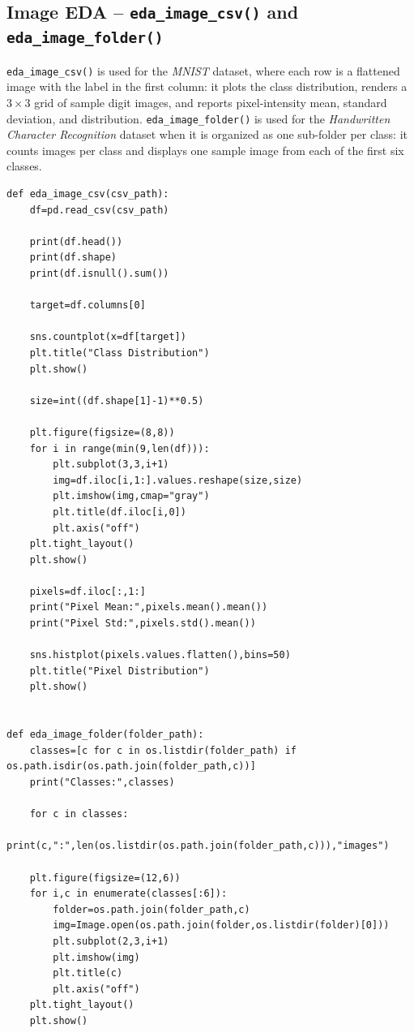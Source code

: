 \documentclass[12pt,a4paper]{article}
\begin{document}
\subsection{Image EDA -- \texttt{eda\_image\_csv()} and \texttt{eda\_image\_folder()}}
\texttt{eda\_image\_csv()} is used for the \textit{MNIST} dataset, where each row is a
flattened image with the label in the first column: it plots the class distribution, renders
a $3\times3$ grid of sample digit images, and reports pixel-intensity mean, standard deviation,
and distribution. \texttt{eda\_image\_folder()} is used for the \textit{Handwritten Character
Recognition} dataset when it is organized as one sub-folder per class: it counts images per
class and displays one sample image from each of the first six classes.
\begin{lstlisting}
def eda_image_csv(csv_path):
    df=pd.read_csv(csv_path)

    print(df.head())
    print(df.shape)
    print(df.isnull().sum())

    target=df.columns[0]

    sns.countplot(x=df[target])
    plt.title("Class Distribution")
    plt.show()

    size=int((df.shape[1]-1)**0.5)

    plt.figure(figsize=(8,8))
    for i in range(min(9,len(df))):
        plt.subplot(3,3,i+1)
        img=df.iloc[i,1:].values.reshape(size,size)
        plt.imshow(img,cmap="gray")
        plt.title(df.iloc[i,0])
        plt.axis("off")
    plt.tight_layout()
    plt.show()

    pixels=df.iloc[:,1:]
    print("Pixel Mean:",pixels.mean().mean())
    print("Pixel Std:",pixels.std().mean())

    sns.histplot(pixels.values.flatten(),bins=50)
    plt.title("Pixel Distribution")
    plt.show()


def eda_image_folder(folder_path):
    classes=[c for c in os.listdir(folder_path) if os.path.isdir(os.path.join(folder_path,c))]
    print("Classes:",classes)

    for c in classes:
        print(c,":",len(os.listdir(os.path.join(folder_path,c))),"images")

    plt.figure(figsize=(12,6))
    for i,c in enumerate(classes[:6]):
        folder=os.path.join(folder_path,c)
        img=Image.open(os.path.join(folder,os.listdir(folder)[0]))
        plt.subplot(2,3,i+1)
        plt.imshow(img)
        plt.title(c)
        plt.axis("off")
    plt.tight_layout()
    plt.show()
\end{lstlisting}
\end{document}
